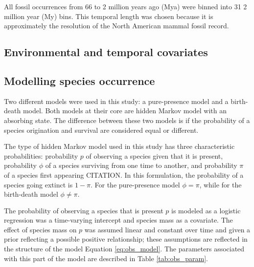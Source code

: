 \documentclass[12pt,letterpaper]{article}
\begin{document}
All fossil occurrences from 66 to 2 million years ago (Mya) were binned into 31 2 million year (My) bins. This temporal length was chosen because it is approximately the resolution of the North American mammal fossil record.



\subsection*{Environmental and temporal covariates}




\subsection*{Modelling species occurrence}


Two different models were used in this study: a pure-presence model and a birth-death model. Both models at their core are hidden Markov model with an absorbing state. The difference between these two models is if the probability of a species origination and survival are considered equal or different. 

The type of hidden Markov model used in this study has three characteristic probabilities: probability \(p\) of observing a species given that it is present, probability \(\phi\) of a species surviving from one time to another, and probability \(\pi\) of a species first appearing CITATION. In this formulation, the probability of a species going extinct is \(1 - \pi\). For the pure-presence model \(\phi = \pi\), while for the birth-death model \(\phi \neq \pi\).

The probability of observing a species that is present \(p\) is modeled as a logistic regression was a time-varying intercept and species mass as a covariate. The effect of species mass on \(p\) was assumed linear and constant over time and given a prior reflecting a possible positive relationship; these assumptions are reflected in the structure of the model Equation \ref{eq:obs_model}. The parameters associated with this part of the model are described in Table \ref{tab:obs_param}.
\end{document}
